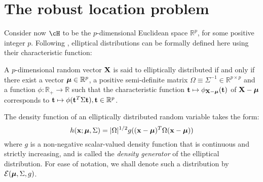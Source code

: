 \documentclass[fleqn,11pt]{article}
\begin{document}
\section{The robust location problem}
Consider now $\cH$ to be the $p$-dimensional Euclidean space $\mathbb R^p$, for some positive integer $p$. Following \cite{FangEtal90}, elliptical distributions can be formally defined here using their characteristic function:
%
\begin{Definition}
A $p$-dimensional random vector ${\mathbf{X}}$ is said to elliptically distributed if and only if there exist a vector ${\boldsymbol{\mu}} \in \mathbb R^p$, a positive semi-definite matrix $\Omega \equiv \Sigma^{-1} \in \mathbb R^{p \times p}$ and a function $\phi: \mathbb R_+ \rightarrow \mathbb R$ such that the characteristic function ${\bf{t}} \mapsto \phi_{{\mathbf{X}} - {\boldsymbol{\mu}}} ({\bf{t}})$ of ${\mathbf{X}} - {\boldsymbol{\mu}}$ corresponds to ${\bf{t}} \mapsto \phi ({\bf{t}}^T \Sigma {\bf{t}}), {\bf{t}} \in \mathbb R^p$.
\end{Definition}
%
The density function of an elliptically distributed random variable takes the form:
%
$$ h({\bf{x}}; {\boldsymbol{\mu}}, \Sigma) = |\Omega|^{1/2} g (({\bf{x}} - {\boldsymbol{\mu}})^T \Omega ({\bf{x}} - {\boldsymbol{\mu}})) $$
%
where $g$ is a non-negative scalar-valued density function that is continuous and strictly increasing, and is called the \textit{density generator} of the elliptical distribution. For ease of notation, we shall denote such a distribution by $\mathcal{E} ({\boldsymbol{\mu}}, \Sigma, g)$.
\end{document}
